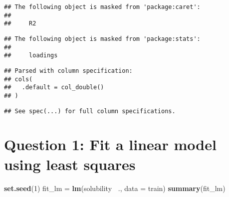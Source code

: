 \documentclass[
]{article}
\newenvironment{Shaded}{\begin{snugshade}}{\end{snugshade}}
\newcommand{\CommentTok}[1]{\textcolor[rgb]{0.56,0.35,0.01}{\textit{#1}}}
\newcommand{\DataTypeTok}[1]{\textcolor[rgb]{0.13,0.29,0.53}{#1}}
\newcommand{\DecValTok}[1]{\textcolor[rgb]{0.00,0.00,0.81}{#1}}
\newcommand{\KeywordTok}[1]{\textcolor[rgb]{0.13,0.29,0.53}{\textbf{#1}}}
\newcommand{\NormalTok}[1]{#1}
\newcommand{\OperatorTok}[1]{\textcolor[rgb]{0.81,0.36,0.00}{\textbf{#1}}}
\newcommand{\StringTok}[1]{\textcolor[rgb]{0.31,0.60,0.02}{#1}}
\begin{document}
\begin{verbatim}
## The following object is masked from 'package:caret':
## 
##     R2
\end{verbatim}

\begin{verbatim}
## The following object is masked from 'package:stats':
## 
##     loadings
\end{verbatim}

\begin{Shaded}
\end{Shaded}

\begin{verbatim}
## Parsed with column specification:
## cols(
##   .default = col_double()
## )
\end{verbatim}

\begin{verbatim}
## See spec(...) for full column specifications.
\end{verbatim}

\begin{Shaded}
\end{Shaded}

\hypertarget{question-1-fit-a-linear-model-using-least-squares}{%
\section{Question 1: Fit a linear model using least
squares}\label{question-1-fit-a-linear-model-using-least-squares}}

\begin{Shaded}
\begin{Highlighting}[]
\KeywordTok{set.seed}\NormalTok{(}\DecValTok{1}\NormalTok{)}
\NormalTok{fit_lm =}\StringTok{ }\KeywordTok{lm}\NormalTok{(solubility }\OperatorTok{~}\NormalTok{., }\DataTypeTok{data =}\NormalTok{ train)}
\KeywordTok{summary}\NormalTok{(fit_lm)}
\end{Highlighting}
\end{Shaded}
\end{document}
